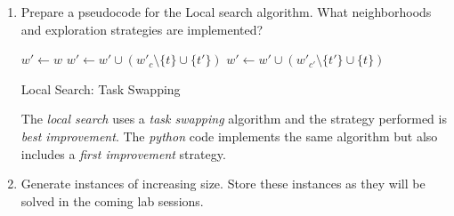 \documentclass[12pt, a4paper]{article}
\begin{document}
\begin{enumerate}[label=(\alph*)]
    \item[\textcolor{QuestionBlue}{\textbullet}] \textcolor{QuestionBlue}{
      Prepare a pseudocode for the Local search algorithm. What neighborhoods and exploration strategies are implemented?
    }

    \begin{algorithm}[H]
      \SetAlgoLined
      \DontPrintSemicolon
      $w' \leftarrow w$\;
      $w' \leftarrow w' \cup (w'_{c} \setminus \{ t \} \cup \{ t' \})$\;
      $w' \leftarrow w' \cup (w'_{c'} \setminus \{ t' \} \cup \{ t \})$\;
      \;
      \caption{Local Search: Task Swapping}
    \end{algorithm}

    The \textit{local search} uses a \textit{task swapping} algorithm and the strategy performed is \textit{best improvement}. The \textit{python} code implements the same algorithm but also includes a \textit{first improvement} strategy.

    \item[\textcolor{QuestionBlue}{\textbullet}] \textcolor{QuestionBlue}{
      Generate instances of increasing size. Store these instances as they will be solved in the coming lab sessions.
    }


\end{enumerate}
\end{document}
